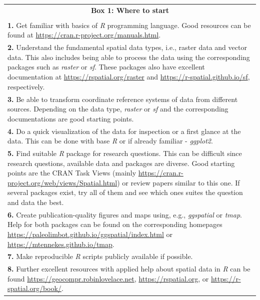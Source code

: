\documentclass[smallextended]{svjour3}       %
\begin{document}
\begin{table}

\small

\begin{tabularx}{1\textwidth}{|X|}

\hline
\multicolumn{1}{|c|}{\textbf{Box 1: Where to start}} \\

\\

\textbf{1.} Get familiar with basics of \textit{R} programming language. 
Good resources can be found at \url{https://cran.r-project.org/manuals.html}. \\

\textbf{2.} Understand the fundamental spatial data types, i.e., raster data and vector data.
This also includes being able to process the data using the corresponding packages such as \textit{raster} or \textit{sf}. 
These packages also have excellent documentation at \url{https://rspatial.org/raster} and \url{https://r-spatial.github.io/sf}, respectively. \\

\textbf{3.} Be able to transform coordinate reference systems of data from different sources. Depending on the data type, \textit{raster} or \textit{sf} and the corresponding documentations are good starting points. \\

\textbf{4.} Do a quick visualization of the data for inspection or a first glance at the data. 
This can be done with base \textit{R} or if already familiar - \textit{ggplot2}. \\

\textbf{5.} Find suitable \textit{R} package for research questions. 
This can be difficult since research questions, available data and packages are diverse. 
Good starting points are the CRAN Task Views (mainly \url{https://cran.r-project.org/web/views/Spatial.html}) or review papers similar to this one. 
If several packages exist, try all of them and see which ones suites the question and data the best. \\

\textbf{6.} Create publication-quality figures and maps using, e.g., \textit{ggspatial} or \textit{tmap}. 
Help for both packages can be found on the corresponding homepages \url{https://paleolimbot.github.io/ggspatial/index.html} or \url{https://mtennekes.github.io/tmap}. \\

\textbf{7.} Make reproducible \textit{R} scripts publicly available if possible. \\

\textbf{8.} Further excellent resources with applied help about spatial data in \textit{R} can be found \url{https://geocompr.robinlovelace.net}, \url{https://rspatial.org}, or \url{https://r-spatial.org/book/}. \\

\hline
\end{tabularx}
\end{table}
\end{document}
